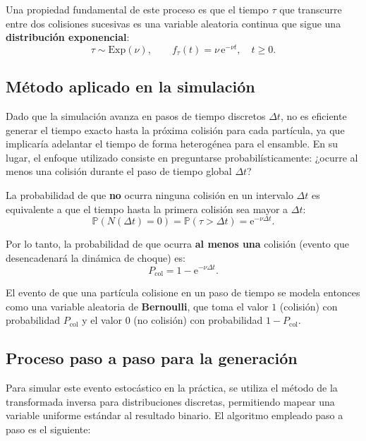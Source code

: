 \documentclass[11pt]{article}
\begin{document}
Una propiedad fundamental de este proceso es que el tiempo $\tau$ que transcurre entre dos colisiones sucesivas es una variable aleatoria continua que sigue una \textbf{distribución exponencial}:
\begin{equation}
  \tau \sim \mathrm{Exp}(\nu),\qquad f_\tau(t)=\nu\,\mathrm{e}^{-\nu t}, \quad t\ge 0.
\end{equation}

\subsection{Método aplicado en la simulación}

Dado que la simulación avanza en pasos de tiempo discretos $\Delta t$, no es eficiente generar el tiempo exacto hasta la próxima colisión para cada partícula, ya que implicaría adelantar el tiempo de forma heterogénea para el ensamble. En su lugar, el enfoque utilizado consiste en preguntarse probabilísticamente: ¿ocurre al menos una colisión durante el paso de tiempo global $\Delta t$?

La probabilidad de que \textbf{no} ocurra ninguna colisión en un intervalo $\Delta t$ es equivalente a que el tiempo hasta la primera colisión sea mayor a $\Delta t$:
\begin{equation}
  \mathbb P(N(\Delta t)=0) = \mathbb P(\tau > \Delta t) = \mathrm{e}^{-\nu\Delta t}.
\end{equation}

Por lo tanto, la probabilidad de que ocurra \textbf{al menos una} colisión (evento que desencadenará la dinámica de choque) es:
\begin{equation}
  P_{\mathrm{col}} = 1 - \mathrm{e}^{-\nu\Delta t}.
\end{equation}

El evento de que una partícula colisione en un paso de tiempo se modela entonces como una variable aleatoria de \textbf{Bernoulli}, que toma el valor $1$ (colisión) con probabilidad $P_{\mathrm{col}}$ y el valor $0$ (no colisión) con probabilidad $1 - P_{\mathrm{col}}$.

\subsection{Proceso paso a paso para la generación}

Para simular este evento estocástico en la práctica, se utiliza el método de la transformada inversa para distribuciones discretas, permitiendo mapear una variable uniforme estándar al resultado binario. El algoritmo empleado paso a paso es el siguiente:
\end{document}
